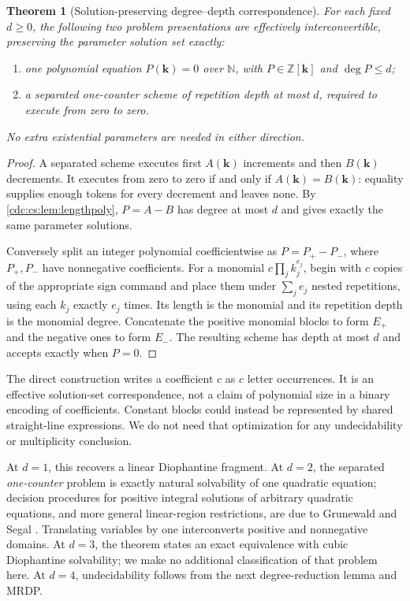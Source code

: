 \documentclass[11pt,a4paper]{article}
\newtheorem{theorem}{Theorem}[section]
\theoremstyle{definition}
\theoremstyle{remark}
\newcommand{\N}{\mathbb N}
\newcommand{\Z}{\mathbb Z}
\begin{document}
\begin{theorem}[Solution-preserving degree--depth correspondence]
\label{cdc:cs:thm:degree_depth}
For each fixed $d\geq0$, the following two problem presentations are
effectively interconvertible, preserving the parameter solution set exactly:
\begin{enumerate}[label=\textnormal{(\roman*)},leftmargin=2em]
\item one polynomial equation $P(\mathbf{k})=0$ over $\N$, with
$P\in\Z[\mathbf{k}]$ and $\deg P\leq d$;
\item a separated one-counter scheme of repetition depth at most $d$,
required to execute from zero to zero.
\end{enumerate}
No extra existential parameters are needed in either direction.
\end{theorem}

\begin{proof}
A separated scheme executes first $A(\mathbf{k})$ increments and then
$B(\mathbf{k})$ decrements. It executes from zero to zero if and only if
$A(\mathbf{k})=B(\mathbf{k})$: equality supplies enough tokens for every
decrement and leaves none. By \cref{cdc:cs:lem:lengthpoly}, $P=A-B$ has degree at
most $d$ and gives exactly the same parameter solutions.

Conversely split an integer polynomial coefficientwise as $P=P_+-P_-$,
where $P_+,P_-$ have nonnegative coefficients. For a monomial
$c\prod_j k_j^{e_j}$, begin with $c$ copies of the appropriate sign command
and place them under $\sum_j e_j$ nested repetitions, using each $k_j$
exactly $e_j$ times. Its length is the monomial and its repetition depth is
the monomial degree. Concatenate the positive monomial blocks to form $E_+$
and the negative ones to form $E_-$. The resulting scheme has depth at most
$d$ and accepts exactly when $P=0$.
\end{proof}

The direct construction writes a coefficient $c$ as $c$ letter occurrences.
It is an effective solution-set correspondence, not a claim of polynomial
size in a binary encoding of coefficients. Constant blocks could instead be
represented by shared straight-line expressions. We do not need that
optimization for any undecidability or multiplicity conclusion.

At $d=1$, this recovers a linear Diophantine fragment. At $d=2$, the separated
\emph{one-counter} problem is exactly natural solvability of one quadratic
equation; decision procedures for positive integral solutions of arbitrary
quadratic equations, and more general linear-region restrictions, are due to
Grunewald and Segal \cite{grunewald-segal}. Translating variables by one
interconverts positive and nonnegative domains. At $d=3$, the theorem states
an exact equivalence with cubic Diophantine solvability; we make no additional
classification of that problem here. At $d=4$, undecidability follows from
the next degree-reduction lemma and MRDP.
\end{document}

